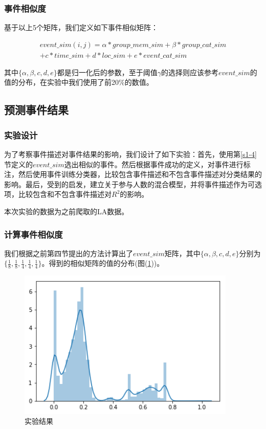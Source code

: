 \subsubsection{事件相似度}
基于以上5个矩阵，我们定义如下事件相似矩阵：

\begin{multline}   
event\_sim(i,j)=\alpha*group\_mem\_sim+\beta*group\_cat\_sim
\\+{c}*time\_sim+{d}*loc\_sim+{e}*event\_cat\_sim
\end{multline}

其中\(\{\alpha,\beta,{c},{d},{e}\}\)都是归一化后的参数，至于阈值\(\gamma\)的选择则应该参考\(event\_sim\)的值的分布，在实验中我们使用了前20\%的数值。
\subsection{预测事件结果}
\subsubsection{实验设计}
为了考察事件描述对事件结果的影响，我们设计了如下实验：首先，使用第\ref{s1-4}节定义的\(event\_sim\)选出相似的事件。然后根据事件成功的定义，对事件进行标注，然后使用事件训练分类器，比较包含事件描述和不包含事件描述对分类结果的影响。最后，受到\citep{noauthor_predicting_nodate}的启发，建立关于参与人数的混合模型，并将事件描述作为可选项，比较包含和不包含事件描述对\(R^2\)的影响。

本次实验的数据为之前爬取的LA数据。

\subsubsection{计算事件相似度}
我们根据之前第四节提出的方法计算出了\(event\_sim\)矩阵，其中\(\{\alpha,\beta,{c},{d},{e}\}\)分别为\(\{\frac{1}{8},\frac{1}{8},\frac{1}{4},\frac{1}{4},\frac{1}{4}\}\)。得到的相似矩阵的值的分布(图(\ref{f1-1}))。

\begin{figure}[htbp]
  \centering
  \includegraphics[width=10.4cm]{event_sim_dist.png}
  \caption{实验结果}
  \label{f1-1}
\end{figure}

